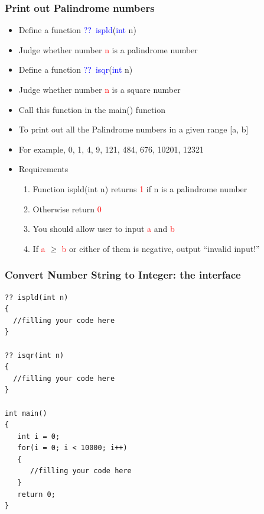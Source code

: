 \begin{frame}
\frametitle{Print out Palindrome numbers}
\begin{itemize}
	\item {Define a function \textcolor{blue}{??~ispld}(\textcolor{blue}{int} n)}
	\item {Judge whether number \textcolor{red}{n} is a palindrome number}
	\item {Define a function \textcolor{blue}{??~isqr}(\textcolor{blue}{int} n)}
	\item {Judge whether number \textcolor{red}{n} is a square number}
	\item {Call this function in the main() function}
	\item {To print out all the Palindrome numbers in a given range [a, b]}
	\item {For example, 0, 1, 4, 9, 121, 484, 676, 10201, 12321}
	\item {Requirements}
	\begin{enumerate}
		\item {Function ispld(int n) returns \textcolor{red}{1} if n is a palindrome number}	
		\item {Otherwise return \textcolor{red}{0}}
		\item {You should allow user to input \textcolor{red}{a} and \textcolor{red}{b}}
		\item {If \textcolor{red}{a} $\geq$ \textcolor{red}{b} or either of them is negative, output ``invalid input!''}
	\end{enumerate}
\end{itemize}

\end{frame}


\begin{frame}[fragile]
\frametitle{Convert Number String to Integer: the interface}

\begin{lstlisting}[linewidth=0.8\linewidth, xleftmargin=0.1\linewidth]
?? ispld(int n)
{
  //filling your code here
}

?? isqr(int n)
{
  //filling your code here
}

int main()
{
   int i = 0;
   for(i = 0; i < 10000; i++)
   {
      //filling your code here
   }
   return 0;
}
\end{lstlisting}
\end{frame}

